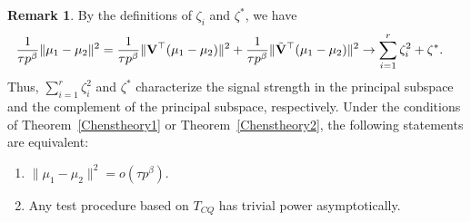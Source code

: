 \documentclass[times,sort&compress,3p]{elsarticle}
\theoremstyle{plain}
\newtheorem{theorem}{\quad\quad Theorem}
\theoremstyle{definition}
\newtheorem{remark}{\quad\quad Remark}
\theoremstyle{remark}
\begin{document}
\begin{remark}\label{remark1}
    By the definitions of $\zeta_i$ and $\zeta^*$, we have
    $$
    \begin{aligned}
        &\frac{1}{\tau p^{\beta}}\|\mu_1-\mu_2\|^2
    =
    \frac{1}{\tau p^{\beta}}\|\mathbf{V}^\top  (\mu_1-\mu_2)\|^2
        +
        \frac{1}{\tau p^{\beta}}\|\tilde{\mathbf{V}}^\top  (\mu_1-\mu_2)\|^2
    \to \sum_{i=1}^r \zeta_i^2+ \zeta^*.
    \end{aligned}
    $$
    Thus, $\sum_{i=1}^r\zeta_i^2$ and $\zeta^*$ characterize the signal strength in the principal subspace and the complement of the principal subspace, respectively.
    Under the conditions of Theorem~\ref{Chenstheory1} or Theorem~\ref{Chenstheory2}, the following statements are equivalent:
    \begin{enumerate}[(1)]
 \item
     $\|\mu_1-\mu_2\|^2=o(\tau p^{\beta})$.
        \item
            Any test procedure based on $T_{CQ}$ has trivial power asymptotically.
    \end{enumerate}
\end{remark}
\end{document}
